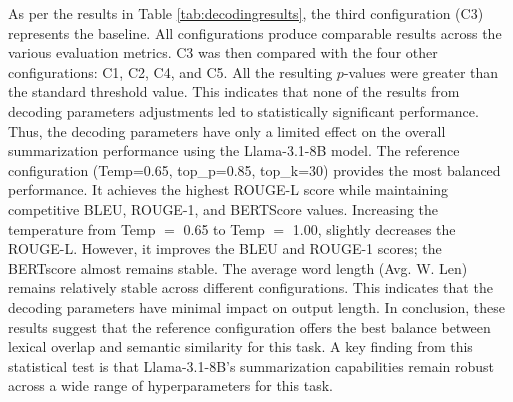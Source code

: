 \documentclass[bdcc,article,submit,pdftex,moreauthors]{Definitions/mdpi}
\begin{document}
\begin{table}[H] 
\caption{The effect of decoding parameters on article summarization performance using Llama-3.1-8B, assessed using the same 50 random articles and reported in Mean ± SD format.\label{tab:decodingresults}}
\end{table}

As per the results in Table \ref{tab:decodingresults}, the third configuration (C3) represents the baseline.
All configurations produce comparable results across the various evaluation metrics. 
C3 was then compared with the four other configurations: C1, C2, C4, and C5. 
All the resulting $p$-values were greater than the standard threshold value. 
This indicates that none of the results from decoding parameters adjustments led to statistically significant  performance. Thus, the decoding parameters have only a limited effect on the overall summarization performance using the Llama-3.1-8B model. The reference configuration (Temp=0.65, top\_p=0.85, top\_k=30) provides the most balanced performance. It achieves the highest ROUGE-L score while maintaining competitive BLEU, ROUGE-1, and BERTScore values. 
Increasing the temperature from Temp $=$ 0.65 to Temp $=$ 1.00, slightly decreases the ROUGE-L. 
However, it improves the BLEU and ROUGE-1 scores; the BERTscore almost remains stable. 
The average word length (Avg. W. Len) remains relatively stable across different configurations. This indicates that the decoding parameters have minimal impact on output length. In conclusion, these results suggest that the reference configuration offers the best balance between lexical overlap and semantic similarity for this task. 
A key finding  from this statistical test is that Llama-3.1-8B’s summarization capabilities remain robust across a wide range of hyperparameters for this task.
\end{document}
